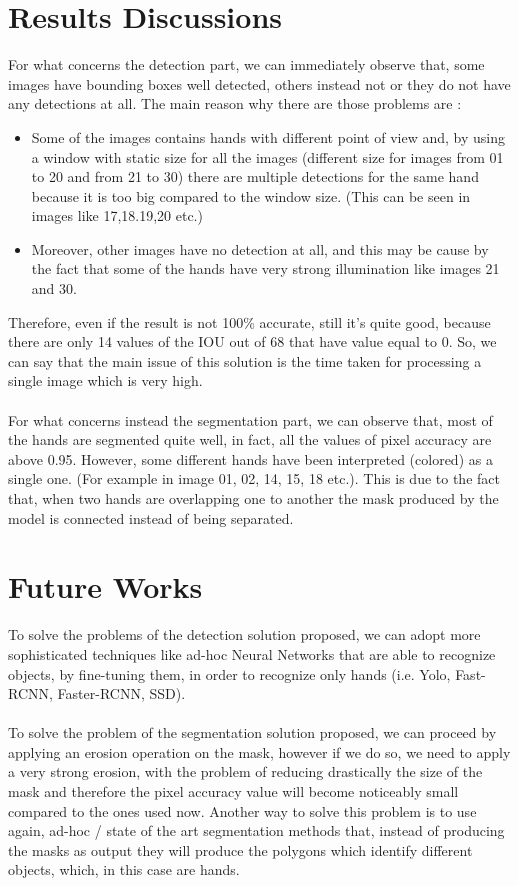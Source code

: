 \section{Results Discussions}
For what concerns the detection part, we can immediately observe that, some images have bounding boxes well detected, others instead not or they do not have any detections at all. 
The main reason why there are those problems are :
\begin{itemize}
    \item Some of the images contains hands with different point of view and, by using a window with static size for all the images (different size for images from 01 to 20 and from 21 to 30) there are multiple detections for the same hand because it is too big compared to the window size. (This can be seen in images like 17,18.19,20 etc.)
    \item Moreover, other images have no detection at all, and this may be cause by the fact that some of the hands have very strong illumination like images 21 and 30.
\end{itemize}
Therefore, even if the result is not 100\% accurate, still it's quite good, because there are only 14 values of the IOU out of 68 that have value equal to 0. So, we can say that the main issue of this solution is the time taken for processing a single image which is very high.\\\\
For what concerns instead the segmentation part, we can observe that, most of the hands are segmented quite well, in fact, all the values of pixel accuracy are above 0.95. However, some different hands have been interpreted (colored) as a single one. (For example in image 01, 02, 14, 15, 18 etc.). This is due to the fact that, when two hands are overlapping one to another the mask produced by the model is connected instead of being separated.

\section{Future Works}
To solve the problems of the detection solution proposed, we can adopt more sophisticated techniques like ad-hoc Neural Networks that are able to recognize objects, by fine-tuning them, in order to recognize only hands (i.e. Yolo, Fast-RCNN, Faster-RCNN, SSD).\\\\
To solve the problem of the segmentation solution proposed, we can proceed by applying an erosion operation on the mask, however if we do so, we need to apply a very strong erosion, with the problem of reducing drastically the size of the mask and therefore the pixel accuracy value will become noticeably small compared to the ones used now. Another way to solve this problem is to use again, ad-hoc / state of the art segmentation methods that, instead of producing the masks as output they will produce the polygons which identify different objects, which, in this case are hands.